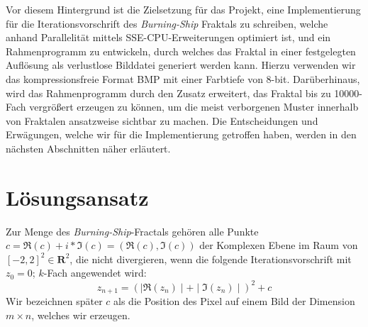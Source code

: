\documentclass[course=erap]{aspdoc}
\begin{document}
\newline
Vor diesem Hintergrund ist die Zielsetzung für das Projekt, eine Implementierung für die Iterationsvorschrift des \emph{Burning-Ship} Fraktals zu schreiben, welche anhand Parallelität mittels SSE-CPU-Erweiterungen optimiert ist, und ein Rahmenprogramm zu entwickeln, durch welches das Fraktal in einer festgelegten Auflösung als verlustlose Bilddatei generiert werden kann. Hierzu verwenden wir das kompressionsfreie Format BMP\cite{BMPMedium}\cite{BMPINFOwingdi} mit einer Farbtiefe von 8-bit. Darüberhinaus, wird das Rahmenprogramm durch den
Zusatz erweitert, das Fraktal bis zu 10000-Fach vergrößert erzeugen zu können, um die meist verborgenen Muster innerhalb von Fraktalen ansatzweise sichtbar zu machen.
\newline
Die Entscheidungen und Erwägungen, welche wir für die Implementierung getroffen haben, werden in den nächsten Abschnitten näher erläutert.
\section{Lösungsansatz}

Zur Menge des \emph{Burning-Ship}-Fractals gehören alle Punkte $c = \Re(c) + i * \Im(c) = (\Re(c), \Im(c))$ der Komplexen Ebene im Raum von $[-2, 2]^2 \in \mathbf{R}^2$, die nicht divergieren, wenn die folgende Iterationsvorschrift mit $z_{0} = 0$; $k$-Fach angewendet wird:
\begin{equation}z_{n+1} = (\mid\Re(z_{n})\mid + \mid\Im(z_{n})\mid)^2 + c\end{equation} Wir bezeichnen später $c$ als die Position des Pixel auf einem Bild der Dimension $m \times n$, welches wir erzeugen.
\end{document}
